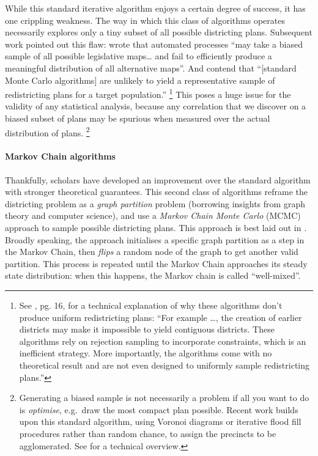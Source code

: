 \documentclass[]{article}
\let\oldparagraph\paragraph
\renewcommand{\paragraph}[1]{\oldparagraph{#1}\mbox{}}
\begin{document}
While this standard iterative algorithm enjoys a certain degree of
success, it has one crippling weakness. The way in which this class of
algorithms operates necessarily explores only a tiny subset of all
possible districting plans. Subsequent work pointed out this flaw:
\citeauthor{mm2018} wrote that automated processes ``may take a biased
sample of all possible legislative maps\ldots{} and fail to efficiently
produce a meaningful distribution of all alternative maps''. And
\citeauthor{fifieldwp} contend that ``{[}standard Monte Carlo
algorithms{]} are unlikely to yield a representative sample of
redistricting plans for a target population.'' \footnote{See
  \cite{fifieldwp}, pg. 16, for a technical explanation of why these
  algorithms don't produce uniform redistricting plans: ``For example
  \ldots{}, the creation of earlier districts may make it impossible to
  yield contiguous districts. These algorithms rely on rejection
  sampling to incorporate constraints, which is an inefficient strategy.
  More importantly, the algorithms come with no theoretical result and
  are not even designed to uniformly sample redistricting plans.''} This
poses a huge issue for the validity of any statistical analysis, because
any correlation that we discover on a biased subset of plans may be
spurious when measured over the actual distribution of plans. \footnote{Generating
  a biased sample is not necessarily a problem if all you want to do is
  \emph{optimise}, e.g.~draw the most compact plan possible. Recent work
  builds upon this standard algorithm, using Voronoi diagrams or
  iterative flood fill procedures rather than random chance, to assign
  the precincts to be agglomerated. See \cite{lf2019} for a technical
  overview.}

\hypertarget{markov-chain-algorithms}{%
\paragraph{Markov Chain algorithms}\label{markov-chain-algorithms}}

Thankfully, scholars have developed an improvement over the standard
algorithm with stronger theoretical guarantees. This second class of
algorithms reframe the districting problem as a \emph{graph partition}
problem (borrowing insights from graph theory and computer science), and
use a \emph{Markov Chain Monte Carlo} (MCMC) approach to sample possible
districting plans. This approach is best laid out in \cite{fifieldwp}.
Broadly speaking, the approach initialises a specific graph partition as
a step in the Markov Chain, then \emph{flips} a random node of the graph
to get another valid partition. This process is repeated until the
Markov Chain approaches its steady state distribution: when this
happens, the Markov chain is called ``well-mixed''.
\end{document}
